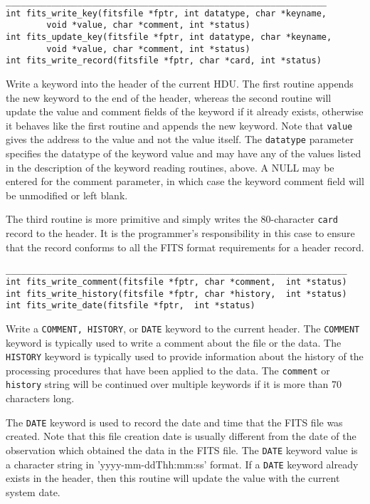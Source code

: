 \documentclass[11pt]{article}
\begin{document}
\begin{verbatim}
_______________________________________________________________
int fits_write_key(fitsfile *fptr, int datatype, char *keyname, 
        void *value, char *comment, int *status)
int fits_update_key(fitsfile *fptr, int datatype, char *keyname,
        void *value, char *comment, int *status)
int fits_write_record(fitsfile *fptr, char *card, int *status)
\end{verbatim}

Write a keyword  into the header of the current HDU.  The first routine
appends the new keyword to the end of the header, whereas the second
routine will update the value and comment fields of the keyword if it
already exists, otherwise it behaves like the first routine and appends
the new keyword.  Note that {\tt value} gives the address to the value
and not the value itself.  The {\tt datatype} parameter specifies the
datatype of the keyword value and may have any of the values listed in
the description of the keyword reading routines, above.  A NULL may be
entered for the comment parameter, in which case the  keyword comment
field will be unmodified or left blank.

The third routine is more primitive and simply writes the 80-character
{\tt card} record to the header.  It is the programmer's responsibility
in this case to ensure that the record conforms to all the FITS format
requirements for a header record.

\begin{verbatim}
___________________________________________________________________
int fits_write_comment(fitsfile *fptr, char *comment,  int *status)
int fits_write_history(fitsfile *fptr, char *history,  int *status)
int fits_write_date(fitsfile *fptr,  int *status)
\end{verbatim}

Write a {\tt COMMENT, HISTORY}, or {\tt DATE} keyword to the current
header.  The {\tt COMMENT} keyword is typically used to write a comment
about the file or the data.  The {\tt HISTORY} keyword is typically
used to provide information about the history of the processing
procedures that have been applied to the data.  The {\tt comment} or
{\tt history} string will be continued over multiple keywords if it is
more than 70 characters long.

The {\tt DATE} keyword is used to record the date and time that the
FITS file was created.  Note that this file creation date is usually
different from the date of the observation which obtained the data in
the FITS file.  The {\tt DATE} keyword value is a character string in
'yyyy-mm-ddThh:mm:ss' format. If a {\tt DATE} keyword already exists in
the header, then this routine will update the value with the current
system date.
\end{document}
